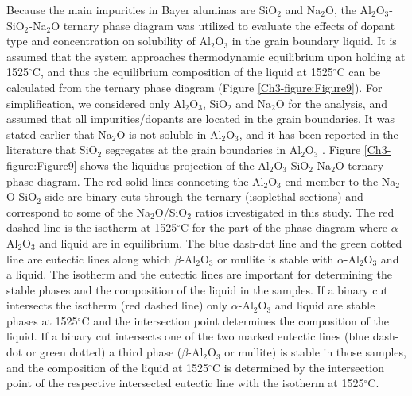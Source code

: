 Because the main impurities in Bayer aluminas are SiO$_{2}$ and Na$_{2}$O, the Al$_{2}$O$_{3}$-SiO$_{2}$-Na$_{2}$O ternary phase diagram \cite{Lambotte2013} was utilized to evaluate the effects of dopant type and concentration on solubility of Al$_{2}$O$_{3}$ in the grain boundary liquid. It is assumed that the system approaches thermodynamic equilibrium upon holding at 1525$^{\circ}$C, and thus the equilibrium composition of the liquid at 1525$^{\circ}$C can be calculated from the ternary phase diagram (Figure \ref{Ch3-figure:Figure9}). For simplification, we considered only Al$_{2}$O$_{3}$, SiO$_{2}$ and Na$_{2}$O for the analysis, and assumed that all impurities/dopants are located in the grain boundaries. It was stated earlier that Na$_{2}$O is not soluble in Al$_{2}$O$_{3}$, and it has been reported in the literature that SiO$_{2}$ segregates at the grain boundaries in Al$_{2}$O$_{3}$ \cite{Park2000}. Figure \ref{Ch3-figure:Figure9} shows the liquidus projection of the Al$_{2}$O$_{3}$-SiO$_{2}$-Na$_{2}$O ternary phase diagram. The red solid lines connecting the Al$_{2}$O$_{3}$ end member to the Na$_{2}$O-SiO$_{2}$ side are binary cuts through the ternary (isoplethal sections) and correspond to some of the Na$_{2}$O/SiO$_{2}$ ratios investigated in this study. The red dashed line is the isotherm at 1525$^{\circ}$C for the part of the phase diagram where $\alpha$-Al$_{2}$O$_{3}$ and liquid are in equilibrium. The blue dash-dot line and the green dotted line are eutectic lines along which $\beta$-Al$_{2}$O$_{3}$ or mullite is stable with $\alpha$-Al$_{2}$O$_{3}$ and a liquid. The isotherm and the eutectic lines are important for determining the stable phases and the composition of the liquid in the samples. If a binary cut intersects the isotherm (red dashed line) only $\alpha$-Al$_{2}$O$_{3}$ and liquid are stable phases at 1525$^{\circ}$C and the intersection point determines the composition of the liquid. If a binary cut intersects one of the two marked eutectic lines (blue dash-dot or green dotted) a third phase ($\beta$-Al$_{2}$O$_{3}$ or mullite) is stable in those samples, and the composition of the liquid at 1525$^{\circ}$C is determined by the intersection point of the respective intersected eutectic line with the isotherm at 1525$^{\circ}$C.

